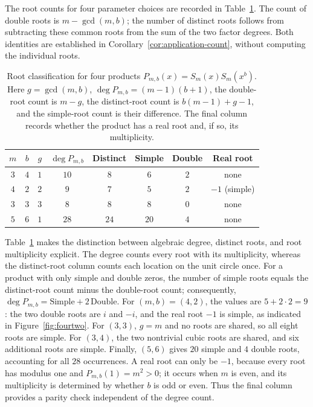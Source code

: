 \documentclass[11pt,a4paper]{article}
\numberwithin{equation}{section}
\theoremstyle{uprightpaper}
\begin{document}
The root counts for four parameter choices are recorded in Table~\ref{tab:twofactorcases}. The count of double roots is $m-\gcd(m,b)$; the number of distinct roots follows from subtracting these common roots from the sum of the two factor degrees. Both identities are established in Corollary~\ref{cor:application-count}, without computing the individual roots.
\begin{table}[H]
\centering
\caption{Root classification for four products $P_{m,b}(x)=S_m(x)S_m(x^b)$. Here $g=\gcd(m,b)$, $\deg P_{m,b}=(m-1)(b+1)$, the double-root count is $m-g$, the distinct-root count is $b(m-1)+g-1$, and the simple-root count is their difference. The final column records whether the product has a real root and, if so, its multiplicity.}
\label{tab:twofactorcases}
\renewcommand{\arraystretch}{1.52}
\begin{tabular*}{\textwidth}{@{}@{\extracolsep{\fill}}cccccccc@{}}
\toprule
$m$ & $b$ & $g$ & $\deg P_{m,b}$ & Distinct & Simple & Double & Real root\\
\midrule
$3$ & $4$ & $1$ & $10$ & $8$ & $6$ & $2$ & none\\
$4$ & $2$ & $2$ & $9$ & $7$ & $5$ & $2$ & $-1$ (simple)\\
$3$ & $3$ & $3$ & $8$ & $8$ & $8$ & $0$ & none\\
$5$ & $6$ & $1$ & $28$ & $24$ & $20$ & $4$ & none\\
\bottomrule
\end{tabular*}
\end{table}

Table~\ref{tab:twofactorcases} makes the distinction between algebraic degree, distinct roots, and root multiplicity explicit. The degree counts every root with its multiplicity, whereas the distinct-root column counts each location on the unit circle once. For a product with only simple and double zeros, the number of simple roots equals the distinct-root count minus the double-root count; consequently, $\deg P_{m,b}=\text{Simple}+2\,\text{Double}$. For $(m,b)=(4,2)$, the values are $5+2\cdot2=9$: the two double roots are $i$ and $-i$, and the real root $-1$ is simple, as indicated in Figure~\ref{fig:fourtwo}. For $(3,3)$, $g=m$ and no roots are shared, so all eight roots are simple. For $(3,4)$, the two nontrivial cubic roots are shared, and six additional roots are simple. Finally, $(5,6)$ gives $20$ simple and $4$ double roots, accounting for all $28$ occurrences. A real root can only be $-1$, because every root has modulus one and $P_{m,b}(1)=m^2>0$; it occurs when $m$ is even, and its multiplicity is determined by whether $b$ is odd or even. Thus the final column provides a parity check independent of the degree count.
\end{document}
